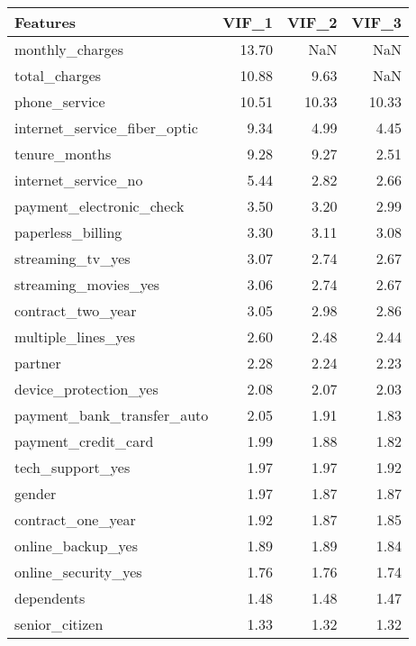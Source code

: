 \begin{tabular}{lrrr}
\toprule
                    Features &  VIF\_1 &  VIF\_2 &  VIF\_3 \\
\midrule
             monthly\_charges &  13.70 &    NaN &    NaN \\
               total\_charges &  10.88 &   9.63 &    NaN \\
               phone\_service &  10.51 &  10.33 &  10.33 \\
internet\_service\_fiber\_optic &   9.34 &   4.99 &   4.45 \\
               tenure\_months &   9.28 &   9.27 &   2.51 \\
         internet\_service\_no &   5.44 &   2.82 &   2.66 \\
    payment\_electronic\_check &   3.50 &   3.20 &   2.99 \\
           paperless\_billing &   3.30 &   3.11 &   3.08 \\
            streaming\_tv\_yes &   3.07 &   2.74 &   2.67 \\
        streaming\_movies\_yes &   3.06 &   2.74 &   2.67 \\
           contract\_two\_year &   3.05 &   2.98 &   2.86 \\
          multiple\_lines\_yes &   2.60 &   2.48 &   2.44 \\
                     partner &   2.28 &   2.24 &   2.23 \\
       device\_protection\_yes &   2.08 &   2.07 &   2.03 \\
  payment\_bank\_transfer\_auto &   2.05 &   1.91 &   1.83 \\
         payment\_credit\_card &   1.99 &   1.88 &   1.82 \\
            tech\_support\_yes &   1.97 &   1.97 &   1.92 \\
                      gender &   1.97 &   1.87 &   1.87 \\
           contract\_one\_year &   1.92 &   1.87 &   1.85 \\
           online\_backup\_yes &   1.89 &   1.89 &   1.84 \\
         online\_security\_yes &   1.76 &   1.76 &   1.74 \\
                  dependents &   1.48 &   1.48 &   1.47 \\
              senior\_citizen &   1.33 &   1.32 &   1.32 \\
\bottomrule
\end{tabular}
